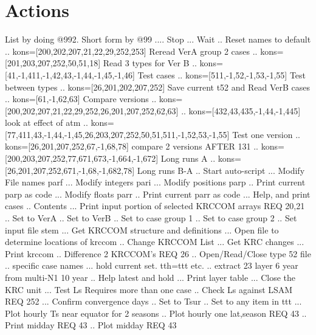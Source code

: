 \documentclass{article}  %
\begin{document}
\section{Actions} %
List by doing  @992.  Short form by @99
\qi {}.... Stop
\qi {}...  Wait
\qi {}.. Reset names to default
\qi {}.. kons=[200,202,207,21,22,29,252,253] Reread VerA group 2 cases
\qi {}.. kons=[201,203,207,252,50,51,18] Read 3 types for Ver B
\qi {}.. kons=[41,-1,411,-1,42,43,-1,44,-1,45,-1,46] Test cases
\qi {}.. kons=[511,-1,52,-1,53,-1,55] Test between types
\qi {}.. kons=[26,201,202,207,252] Save current t52 and Read VerB cases
\qi {}.. kons=[61,-1,62,63] Compare versions
\qi {}.. kons=[200,202,207,21,22,29,252,26,201,207,252,62,63]
\qi {}.. kons=[432,43,435,-1,44,-1,445] look at effect of atm
\qi {}.. kons=[77,411,43,-1,44,-1,45,26,203,207,252,50,51,511,-1,52,53,-1,55] Test one version
\qi {}.. kons=[26,201,207,252,67,-1,68,78] compare 2 versions AFTER 131
\qi {}.. kons=[200,203,207,252,77,671,673,-1,664,-1,672] Long runs A
\qi {}.. kons=[26,201,207,252,671,-1,68,-1,682,78] Long runs B-A
\qi {}.. Start auto-script 
\qi {}... Modify File names parf
\qi {}... Modify integers pari
\qi {}... Modify positions parp
\qi {}.. Print current parp as code
\qi {}... Modify floats parr
\qi {}.. Print current parr as code
\qi {}... Help, and print cases
\qi {}.. Contents
\qi {}... Print input portion of selected KRCCOM arrays REQ 20,21
\qi {}.. Set to VerA 
\qi {}.. Set to VerB
\qi {}.. Set to case group 1
\qi {}.. Set to case group 2
\qi {}.. Set input file stem
\qi {}... Get KRCCOM structure and definitions
\qi {}... Open file to determine locations of krccom
\qi {}.. Change KRCCOM List
\qi {}... Get KRC changes
\qi {}... Print krccom
\qi {}.. Difference 2 KRCCOM's  REQ 26
\qi {}.. Open/Read/Close type 52 file
\qi {}.. specific case names
\qi {}... hold current set. tth=ttt etc. 
\qi {}.. extract 23 layer 6 year from multi-N1 10 year 
\qi {}.. Help latest and hold
\qi {}... Print layer table
\qi {}... Close the KRC unit
\qi {}... Test Ls  Requires more than one case
\qi {}.. Check Ls against LSAM REQ 252
\qi {}... Confirm convergence days 
\qi {}.. Set to Tsur
\qi {}.. Set to any item in ttt
\qi {}... Plot hourly Ts near equator for 2 seasons
\qi {}.. Plot hourly one lat,season  REQ 43 
\qi {}.. Print midday REQ 43
\qi {}.. Plot midday REQ 43
\end{document}
